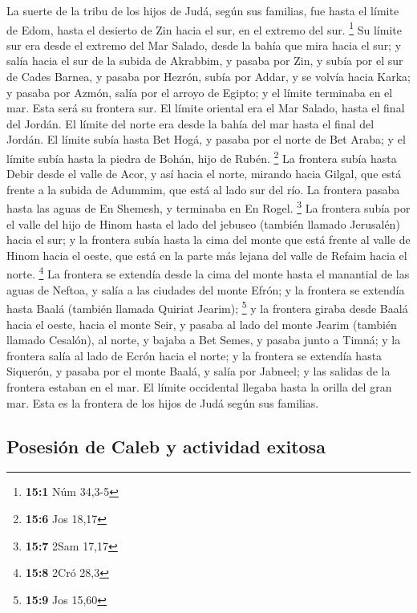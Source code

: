 \begin{paracol}{2}
 La suerte de la tribu de los hijos de Judá, según sus
familias, fue hasta el límite de Edom, hasta el desierto de Zin hacia el
sur, en el extremo del sur. \footnote{\textbf{15:1} Núm 34,3-5}
 Su límite sur era desde el extremo del Mar Salado, desde
la bahía que mira hacia el sur;  y salía hacia el sur de
la subida de Akrabbim, y pasaba por Zin, y subía por el sur de Cades
Barnea, y pasaba por Hezrón, subía por Addar, y se volvía hacia Karka;
 y pasaba por Azmón, salía por el arroyo de Egipto; y el
límite terminaba en el mar. Esta será su frontera sur.  El
límite oriental era el Mar Salado, hasta el final del Jordán. El límite
del norte era desde la bahía del mar hasta el final del Jordán.
 El límite subía hasta Bet Hogá, y pasaba por el norte de
Bet Araba; y el límite subía hasta la piedra de Bohán, hijo de Rubén.
\footnote{\textbf{15:6} Jos 18,17}  La frontera subía
hasta Debir desde el valle de Acor, y así hacia el norte, mirando hacia
Gilgal, que está frente a la subida de Adummim, que está al lado sur del
río. La frontera pasaba hasta las aguas de En Shemesh, y terminaba en En
Rogel. \footnote{\textbf{15:7} 2Sam 17,17}  La frontera
subía por el valle del hijo de Hinom hasta el lado del jebuseo (también
llamado Jerusalén) hacia el sur; y la frontera subía hasta la cima del
monte que está frente al valle de Hinom hacia el oeste, que está en la
parte más lejana del valle de Refaim hacia el norte. \footnote{\textbf{15:8}
  2Cró 28,3}  La frontera se extendía desde la cima del
monte hasta el manantial de las aguas de Neftoa, y salía a las ciudades
del monte Efrón; y la frontera se extendía hasta Baalá (también llamada
Quiriat Jearim); \footnote{\textbf{15:9} Jos 15,60}  y la
frontera giraba desde Baalá hacia el oeste, hacia el monte Seir, y
pasaba al lado del monte Jearim (también llamado Cesalón), al norte, y
bajaba a Bet Semes, y pasaba junto a Timná;  y la
frontera salía al lado de Ecrón hacia el norte; y la frontera se
extendía hasta Siquerón, y pasaba por el monte Baalá, y salía por
Jabneel; y las salidas de la frontera estaban en el mar. 
El límite occidental llegaba hasta la orilla del gran mar. Esta es la
frontera de los hijos de Judá según sus familias.

\hypertarget{posesiuxf3n-de-caleb-y-actividad-exitosa}{%
\subsection{Posesión de Caleb y actividad
exitosa}\label{posesiuxf3n-de-caleb-y-actividad-exitosa}}


\end{paracol}
